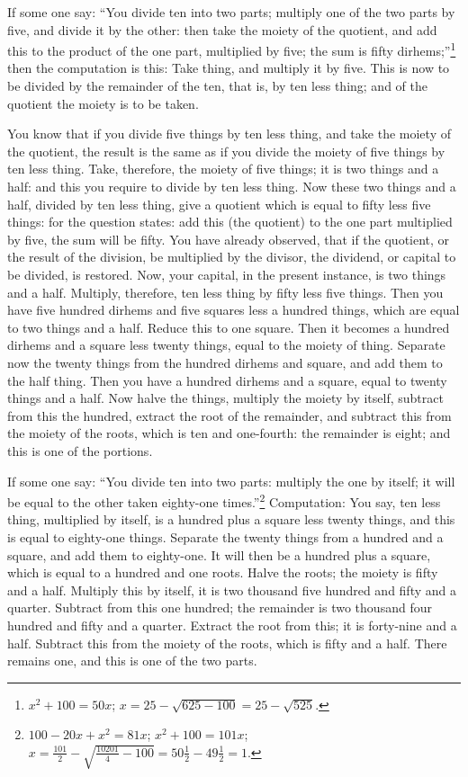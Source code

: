 If some one say: ``You divide ten into two parts; multiply one of the two parts by five, and divide it by the other: then take the moiety of the quotient, and add this to the product of the one part, multiplied by five; the sum is fifty dirhems;''\footnote{$x^2 + 100 = 50x$; $x = 25 - \sqrt{625-100} = 25 - \sqrt{525}$.} then the computation is this: Take thing, and multiply it by five. This is now to be divided by the remainder of the ten, that is, by ten less thing; and of the quotient the moiety is to be taken.

You know that if you divide five things by ten less thing, and take the moiety of the quotient, the result is the same as if you divide the moiety of five things by ten less thing. Take, therefore, the moiety of five things; it is two things and a half: and this you require to divide by ten less thing. Now these two things and a half, divided by ten less thing, give a quotient which is equal to fifty less five things: for the question states: add this (the quotient) to the one part multiplied by five, the sum will be fifty. You have already observed, that if the quotient, or the result of the division, be multiplied by the divisor, the dividend, or capital to be divided, is restored. Now, your capital, in the present instance, is two things and a half. Multiply, therefore, ten less thing by fifty less five things. Then you have five hundred dirhems and five squares less a hundred things, which are equal to two things and a half. Reduce this to one square. Then it becomes a hundred dirhems and a square less twenty things, equal to the moiety of thing. Separate now the twenty things from the hundred dirhems and square, and add them to the half thing. Then you have a hundred dirhems and a square, equal to twenty things and a half. Now halve the things, multiply the moiety by itself, subtract from this the hundred, extract the root of the remainder, and subtract this from the moiety of the roots, which is ten and one-fourth: the remainder is eight; and this is one of the portions.

If some one say: ``You divide ten into two parts: multiply the one by itself; it will be equal to the other taken eighty-one times.''\footnote{$100 - 20x + x^2 = 81x$; $x^2 + 100 = 101x$; $x = \frac{101}{2} - \sqrt{\frac{10201}{4} - 100} = 50\frac{1}{2} - 49\frac{1}{2} = 1$.} Computation: You say, ten less thing, multiplied by itself, is a hundred plus a square less twenty things, and this is equal to eighty-one things. Separate the twenty things from a hundred and a square, and add them to eighty-one. It will then be a hundred plus a square, which is equal to a hundred and one roots. Halve the roots; the moiety is fifty and a half. Multiply this by itself, it is two thousand five hundred and fifty and a quarter. Subtract from this one hundred; the remainder is two thousand four hundred and fifty and a quarter. Extract the root from this; it is forty-nine and a half. Subtract this from the moiety of the roots, which is fifty and a half. There remains one, and this is one of the two parts.

